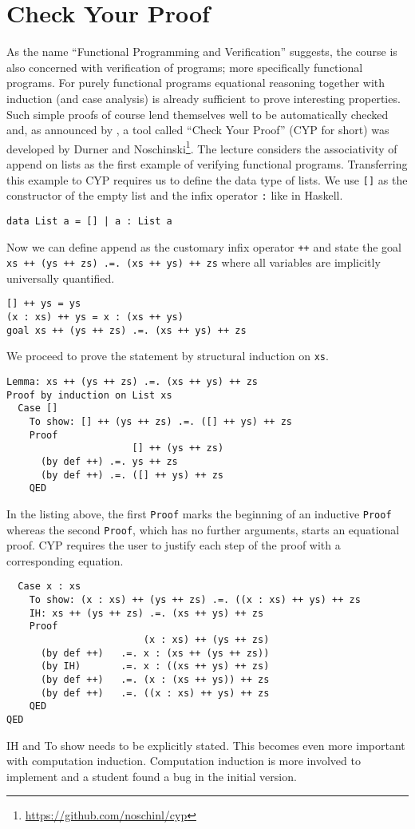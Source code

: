 \section{Check Your Proof}
As the name ``Functional Programming and Verification'' suggests, the course is also concerned with verification of programs; more specifically functional programs.
For purely functional programs equational reasoning together with induction (and case analysis) is already sufficient to prove interesting properties.
Such simple proofs of course lend themselves well to be automatically checked and, as announced by \citet{next_1100}, a tool called ``Check Your Proof'' (CYP for short) was developed by Durner and Noschinski\footnote{\url{https://github.com/noschinl/cyp}}.
The lecture considers the associativity of append on lists as the first example of verifying functional programs.
Transferring this example to CYP requires us to define the data type of lists.
We use \lstinline![]! as the constructor of the empty list and the infix operator \lstinline!:! like in Haskell.
\begin{lstlisting}
data List a = [] | a : List a
\end{lstlisting}
Now we can define append as the customary infix operator \lstinline!++! and state the goal \lstinline!xs ++ (ys ++ zs) .=. (xs ++ ys) ++ zs! where all variables are implicitly universally quantified.
\begin{lstlisting}
[] ++ ys = ys
(x : xs) ++ ys = x : (xs ++ ys)
goal xs ++ (ys ++ zs) .=. (xs ++ ys) ++ zs
\end{lstlisting}
We proceed to prove the statement by structural induction on \lstinline!xs!.
\begin{lstlisting}
Lemma: xs ++ (ys ++ zs) .=. (xs ++ ys) ++ zs
Proof by induction on List xs
  Case []
    To show: [] ++ (ys ++ zs) .=. ([] ++ ys) ++ zs
    Proof
                      [] ++ (ys ++ zs)
      (by def ++) .=. ys ++ zs
      (by def ++) .=. ([] ++ ys) ++ zs
    QED
\end{lstlisting}
In the listing above, the first \lstinline!Proof! marks the beginning of an inductive \lstinline!Proof! whereas the second \lstinline!Proof!, which has no further arguments, starts an equational proof.
CYP requires the user to justify each step of the proof with a corresponding equation.
\begin{lstlisting}
  Case x : xs
    To show: (x : xs) ++ (ys ++ zs) .=. ((x : xs) ++ ys) ++ zs
    IH: xs ++ (ys ++ zs) .=. (xs ++ ys) ++ zs
    Proof
                        (x : xs) ++ (ys ++ zs)
      (by def ++)   .=. x : (xs ++ (ys ++ zs))
      (by IH)       .=. x : ((xs ++ ys) ++ zs)
      (by def ++)   .=. (x : (xs ++ ys)) ++ zs
      (by def ++)   .=. ((x : xs) ++ ys) ++ zs
    QED
QED
\end{lstlisting}
IH and To show needs to be explicitly stated.
This becomes even more important with computation induction.
Computation induction is more involved to implement and a student found a bug in the initial version.

